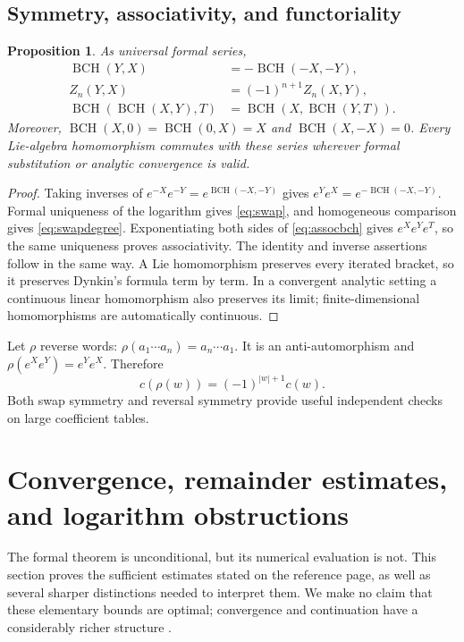 \documentclass[11pt]{article}
\numberwithin{equation}{section}
\newtheorem{proposition}[proposition]{Proposition}
\theoremstyle{definition}
\theoremstyle{remark}
\DeclareMathOperator{\BCH}{BCH}
\begin{document}
\subsection{Symmetry, associativity, and functoriality}
\begin{proposition}\label{prop:symmetry}
As universal formal series,
\begin{align}
 \BCH(Y,X)&=-\BCH(-X,-Y),\label{eq:swap}\\
 Z_n(Y,X)&=(-1)^{n+1}Z_n(X,Y),\label{eq:swapdegree}\\
 \BCH(\BCH(X,Y),T)&=\BCH(X,\BCH(Y,T)).\label{eq:assocbch}
\end{align}
Moreover, $\BCH(X,0)=\BCH(0,X)=X$ and
$\BCH(X,-X)=0$. Every Lie-algebra homomorphism commutes with these
series wherever formal substitution or analytic convergence is valid.
\end{proposition}
\begin{proof}
Taking inverses of $e^{-X}e^{-Y}=e^{\BCH(-X,-Y)}$ gives
$e^Ye^X=e^{-\BCH(-X,-Y)}$. Formal uniqueness of the logarithm gives
\eqref{eq:swap}, and homogeneous comparison gives
\eqref{eq:swapdegree}. Exponentiating both sides of
\eqref{eq:assocbch} gives $e^Xe^Ye^T$, so the same uniqueness proves
associativity. The identity and inverse assertions follow in the
same way. A Lie homomorphism preserves every iterated bracket, so it
preserves Dynkin's formula term by term. In a convergent analytic
setting a continuous linear homomorphism also preserves its limit;
finite-dimensional homomorphisms are automatically continuous.
\end{proof}
Let $\rho$ reverse words: $\rho(a_1\cdots a_n)=a_n\cdots a_1$.
It is an anti-automorphism and
$\rho(e^Xe^Y)=e^Ye^X$. Therefore
\begin{equation}\label{eq:reversal}
 c(\rho(w))=(-1)^{|w|+1}c(w).
\end{equation}
Both swap symmetry and reversal symmetry provide useful independent
checks on large coefficient tables.

\section{Convergence, remainder estimates, and logarithm obstructions}
\label{sec:convergence}
The formal theorem is unconditional, but its numerical evaluation is
not. This section proves the sufficient estimates stated on the
reference page, as well as several sharper distinctions needed to
interpret them. We make no claim that these elementary bounds are
optimal; convergence and continuation have a considerably richer
structure \cite{biagi}.
\end{document}
